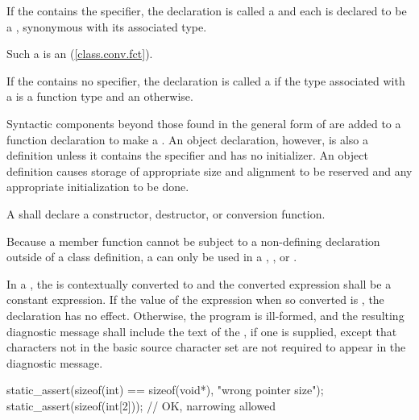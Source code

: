\pnum
If the  contains the 
specifier, the declaration is called a 
and each 
is declared to be a , synonymous with its
associated type.
\begin{note}
Such a  is an 
(\ref{class.conv.fct}).
\end{note}
If the
 contains no  specifier, the
declaration is called a  if
the type associated with a  is a function type and
an  otherwise.

\pnum
{}%
Syntactic components beyond those found in the general form of
 are added to a function declaration to make a
. An object declaration, however, is also
a definition unless it contains the  specifier and has no
initializer.
%
An object definition causes storage of appropriate size and alignment to be reserved and
any appropriate initialization to be done.

\pnum
A  shall declare a
constructor, destructor, or conversion function.
\begin{note}
Because a member function cannot be subject to a non-defining declaration
outside of a class definition, a 
can only be used in a ,
, or
.
\end{note}

\pnum
{}%
In a ,
the 
is contextually converted to  and
the converted expression shall be a constant expression.
If the value of the expression when
so converted is , the declaration has no
effect. Otherwise, the program is ill-formed, and the resulting
diagnostic message shall include the text of
the , if one is supplied,
except that characters not in the basic
source character set are not required to appear in
the diagnostic message.
\begin{example}
\begin{codeblock}
static_assert(sizeof(int) == sizeof(void*), "wrong pointer size");
static_assert(sizeof(int[2]));          // OK, narrowing allowed
\end{codeblock}
\end{example}

